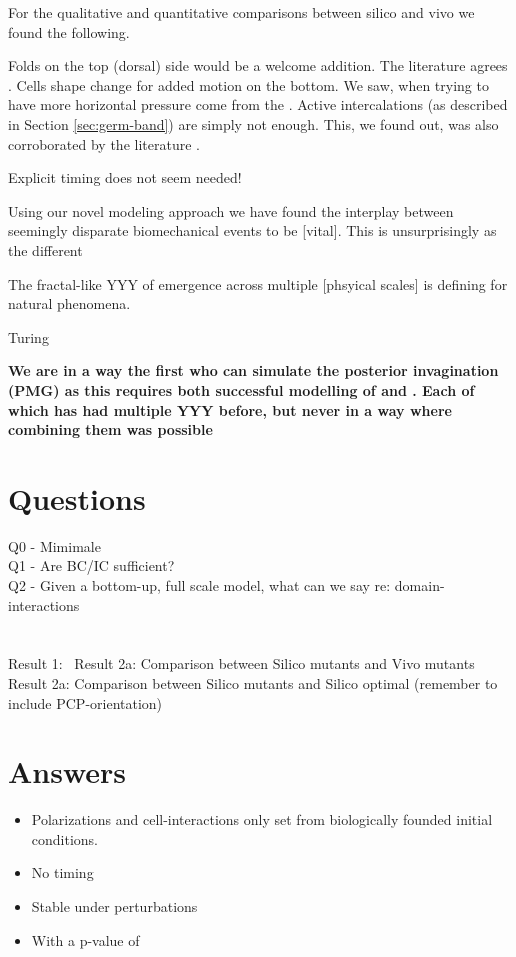 For the qualitative and quantitative comparisons between silico and vivo we found the following.

Folds on the top (dorsal) side would be a welcome addition. The literature agrees \reph{}. Cells shape change for added motion on the bottom. We saw, when trying to have more horizontal pressure come from the . Active intercalations (as described in Section \ref{sec:germ-band}) are simply not enough. This, we found out, was also corroborated by the literature \cite{detder}.

Explicit timing does not seem needed!

Using our novel modeling approach we have found the interplay between seemingly disparate biomechanical events to be [vital]. This is   unsurprisingly as the different   

The fractal-like YYY of emergence across multiple [phsyical scales] is defining for natural phenomena.

Turing


\textbf{We are in a way the first who can simulate the posterior invagination (PMG)  as this requires both successful modelling of  and . Each of which has had multiple YYY before, but never in a way where combining them was possible}


\section{Questions}
Q0 - Mimimale\\
Q1 - Are BC/IC sufficient?\\
Q2 - Given a bottom-up, full scale model, what can we say re: domain-interactions\\
\\\\
Result 1: \
Result 2a: Comparison between Silico mutants and Vivo mutants\\
Result 2a: Comparison between Silico mutants and Silico optimal (remember to include PCP-orientation)\\

\section{Answers}
\begin{itemize}
    \item Polarizations and cell-interactions only set from biologically founded initial conditions.
    \item No  timing
    \item Stable under perturbations
    \item With a p-value of 
\end{itemize}

